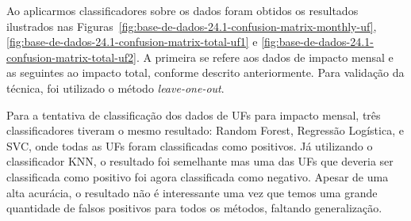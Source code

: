 Ao aplicarmos classificadores sobre os dados foram obtidos os resultados ilustrados nas Figuras~\ref{fig:base-de-dados-24.1-confusion-matrix-monthly-uf}, \ref{fig:base-de-dados-24.1-confusion-matrix-total-uf1} e \ref{fig:base-de-dados-24.1-confusion-matrix-total-uf2}. A primeira se refere aos dados de impacto mensal e as seguintes ao impacto total, conforme descrito anteriormente. Para validação da técnica, foi utilizado o método \textit{leave-one-out}. 

Para a tentativa de classificação dos dados de UFs para impacto mensal, três classificadores tiveram o mesmo resultado: Random Forest, Regressão Logística, e SVC, onde todas as UFs foram classificadas como positivos. Já utilizando o classificador KNN, o resultado foi semelhante mas uma das UFs que deveria ser classificada como positivo foi agora classificada como negativo. Apesar de uma alta acurácia, o resultado não é interessante uma vez que temos uma grande quantidade de falsos positivos para todos os métodos, faltando generalização.

